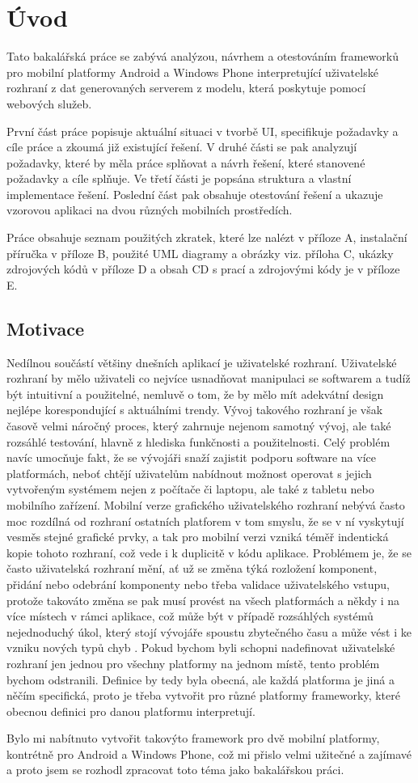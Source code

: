 \chapter{Úvod}
Tato bakalářská práce se zabývá analýzou, návrhem a otestováním frameworků pro mobilní platformy Android a Windows Phone interpretující uživatelské rozhraní z dat generovaných serverem z modelu, která poskytuje pomocí webových služeb.

První část práce popisuje aktuální situaci v tvorbě UI, specifikuje požadavky a cíle práce a zkoumá již existující řešení. V druhé části se pak analyzují požadavky, které by měla práce splňovat a návrh řešení, které stanovené požadavky a cíle splňuje. Ve třetí části je popsána struktura a vlastní implementace řešení. Poslední část pak obsahuje otestování řešení a ukazuje vzorovou aplikaci na dvou různých mobilních prostředích.

Práce obsahuje seznam použitých zkratek, které lze nalézt v příloze A, instalační příručka v příloze B, použité UML diagramy a obrázky viz. příloha C, ukázky zdrojových kódů v příloze D a obsah CD s prací a zdrojovými kódy je v příloze E.
 

\section{Motivace}
Nedílnou součástí většiny dnešních aplikací je uživatelské rozhraní. Uživatelské rozhraní by mělo uživateli co nejvíce usnadňovat manipulaci se softwarem a tudíž být intuitivní a použitelné, nemluvě o tom, že by mělo mít adekvátní design nejlépe korespondující s aktuálními trendy. Vývoj takového rozhraní je však časově velmi náročný proces, který zahrnuje nejenom samotný vývoj, ale také rozsáhlé testování, hlavně z hlediska funkčnosti a použitelnosti. Celý problém navíc umocňuje fakt, že se vývojáři snaží zajistit podporu software na více platformách, neboť chtějí uživatelům nabídnout možnost operovat s jejich vytvořeným systémem nejen z počítače či laptopu, ale také z tabletu nebo mobilního zařízení. Mobilní verze grafického uživatelského rozhraní nebývá často moc rozdílná od rozhraní ostatních platforem v tom smyslu, že se v ní vyskytují vesměs stejné grafické prvky, a tak pro mobilní verzi vzniká téměř indentická kopie tohoto rozhraní, což vede i k duplicitě v kódu aplikace. Problémem je, že se často uživatelská rozhraní mění, ať už se změna týká rozložení komponent, přidání nebo odebrání komponenty nebo třeba validace uživatelského vstupu, protože takováto změna se pak musí provést na všech platformách a někdy i na více místech v rámci aplikace, což může být v případě rozsáhlých systémů nejednoduchý úkol, který stojí vývojáře spoustu zbytečného času a může vést i ke vzniku nových typů chyb \cite{towards-smart-design}. Pokud bychom byli schopni nadefinovat uživatelské rozhraní jen jednou pro všechny platformy na jednom místě, tento problém bychom odstranili. Definice by tedy byla obecná, ale každá platforma je jiná a něčím specifická, proto je třeba vytvořit pro různé platformy frameworky, které obecnou definici pro danou platformu interpretují. 

Bylo mi nabítnuto vytvořit takovýto framework pro dvě mobilní platformy, kontrétně pro Android a Windows Phone, což mi přislo velmi užitečné a zajímavé a proto jsem se rozhodl zpracovat toto téma jako bakalářskou práci.
